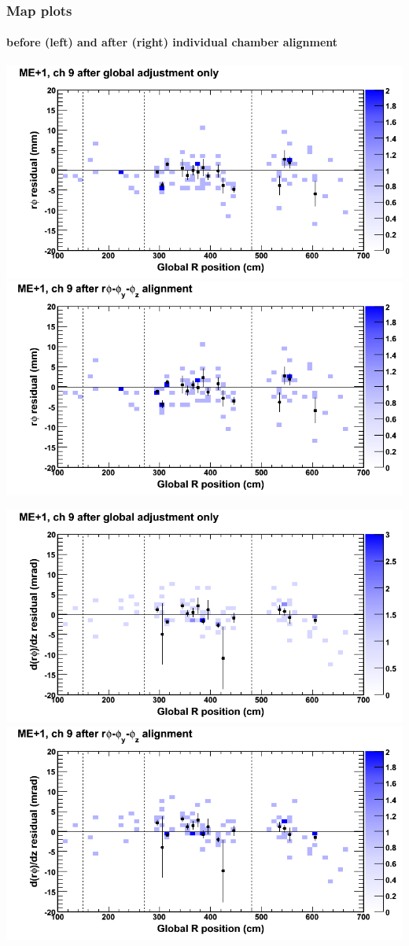 \documentclass[compress]{beamer}
\begin{document}
\begin{frame}
\frametitle{Map plots}
\framesubtitle{before (left) and after (right) individual chamber alignment}
\includegraphics[width=0.5\linewidth]{ringmapplots_3dof/before_CSCvsr_mep1ch09_x.png} \includegraphics[width=0.5\linewidth]{ringmapplots_3dof/after_CSCvsr_mep1ch09_x.png}

\includegraphics[width=0.5\linewidth]{ringmapplots_3dof/before_CSCvsr_mep1ch09_dxdz.png} \includegraphics[width=0.5\linewidth]{ringmapplots_3dof/after_CSCvsr_mep1ch09_dxdz.png}
\end{frame}
\end{document}
